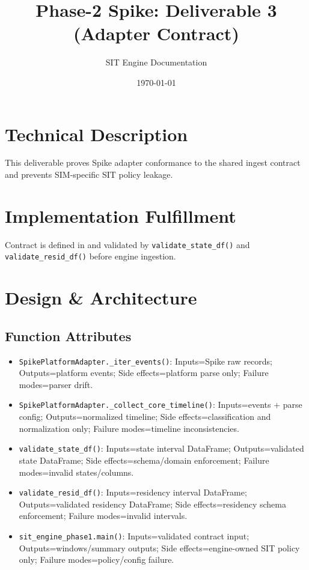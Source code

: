 \documentclass[11pt,a4paper]{article}
\title{Phase-2 Spike: Deliverable 3 (Adapter Contract)}
\author{SIT Engine Documentation}
\date{\today}
\newcommand{\codepath}[1]{\path{#1}}
\begin{document}
\maketitle

\section{Technical Description}
This deliverable proves Spike adapter conformance to the shared ingest contract and prevents SIM-specific SIT policy leakage.

\section{Implementation Fulfillment}
Contract is defined in \codepath{Phase-2/ADAPTERS.md} and validated by \texttt{validate\_state\_df()} and \texttt{validate\_resid\_df()} before engine ingestion.

\section{Design \& Architecture}
\subsection*{Function Attributes}
\begin{itemize}[leftmargin=*]
  \item \texttt{SpikePlatformAdapter.\_iter\_events()}: Inputs=Spike raw records; Outputs=platform events; Side effects=platform parse only; Failure modes=parser drift.
  \item \texttt{SpikePlatformAdapter.\_collect\_core\_timeline()}: Inputs=events + parse config; Outputs=normalized timeline; Side effects=classification and normalization only; Failure modes=timeline inconsistencies.
  \item \texttt{validate\_state\_df()}: Inputs=state interval DataFrame; Outputs=validated state DataFrame; Side effects=schema/domain enforcement; Failure modes=invalid states/columns.
  \item \texttt{validate\_resid\_df()}: Inputs=residency interval DataFrame; Outputs=validated residency DataFrame; Side effects=residency schema enforcement; Failure modes=invalid intervals.
  \item \texttt{sit\_engine\_phase1.main()}: Inputs=validated contract input; Outputs=windows/summary outputs; Side effects=engine-owned SIT policy only; Failure modes=policy/config failure.
\end{itemize}
\end{document}

